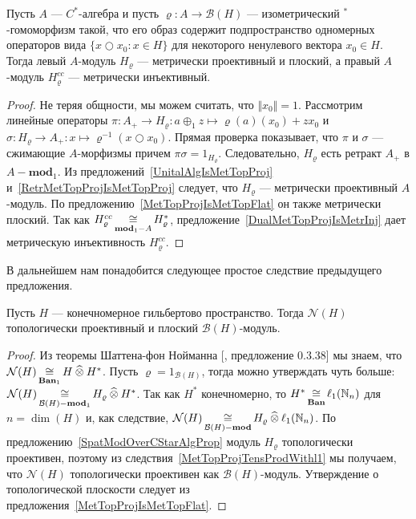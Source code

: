 \begin{proposition}\label{SpatModOverCStarAlgProp} Пусть $A$ --- $C^*$-алгебра и
пусть $\varrho:A\to\mathcal{B}(H)$ --- изометрический ${}^*$-гомоморфизм такой,
что его образ содержит подпространство одномерных операторов вида 
$ \{x\bigcirc x_0:x\in H \}$ для некоторого ненулевого вектора $x_0\in H$. 
Тогда левый $A$-модуль $H_\varrho$ --- метрически проективный и плоский, 
а правый $A$-модуль $H_\varrho^{cc}$ --- метрически инъективный.
\end{proposition}
\begin{proof} Не теряя общности, мы можем считать, что $\Vert x_0\Vert=1$.
Рассмотрим линейные операторы 
$\pi:A_+\to H_\varrho:a\oplus_1 z\mapsto \varrho(a)(x_0)+zx_0$ и 
$\sigma:H_\varrho\to A_+:x\mapsto \varrho^{-1}(x\bigcirc x_0)$. 
Прямая проверка показывает, что $\pi$ и $\sigma$ --- сжимающие
$A$-морфизмы причем $\pi\sigma=1_{H_\varrho}$. Следовательно, $H_\varrho$ есть
ретракт $A_+$ в $A-\mathbf{mod}_1$. Из предложений~\ref{UnitalAlgIsMetTopProj}
и~\ref{RetrMetTopProjIsMetTopProj} следует, что $H_\varrho$ --- метрически
проективный $A$-модуль. По предложению~\ref{MetTopProjIsMetTopFlat} он также
метрически плоский. Так как $H_\varrho^{cc}\mathop{\mathbin{\cong}}\limits_{\mathbf{mod}_1-A}H_\varrho^*$,
предложение~\ref{DualMetTopProjIsMetrInj} дает метрическую инъективность
$H_\varrho^{cc}$.
\end{proof}

В дальнейшем нам понадобится следующее простое следствие предыдущего
предложения.

\begin{proposition}\label{FinDimNHModTopProjFlat} Пусть $H$ --- конечномерное
гильбертово пространство. Тогда $\mathcal{N}(H)$ топологически проективный и
плоский $\mathcal{B}(H)$-модуль.
\end{proposition}
\begin{proof} Из теоремы Шаттена-фон Нойманна [\cite{HelBanLocConvAlg},
предложение 0.3.38] мы знаем, что 
$\mathcal{N}(H)\mathop{\mathbin{\cong}}\limits_{\mathbf{Ban}_1}H\mathbin{\widehat{\otimes}} H^*$. 
Пусть $\varrho=1_{\mathcal{B}(H)}$, тогда можно утверждать чуть больше:
$\mathcal{N}(H)\mathop{\mathbin{\cong}}\limits_{\mathcal{B}(H)-\mathbf{mod}_1} H_\varrho\mathbin{\widehat{\otimes}} H^*$. Так
как $H^*$ конечномерно, то $H^*\mathop{\mathbin{\cong}}\limits_{\mathbf{Ban}}\ell_1(\mathbb{N}_n)$ для
$n=\dim(H)$ и, как следствие, $\mathcal{N}(H)\mathop{\mathbin{\cong}}\limits_{\mathcal{B}(H)-\mathbf{mod}}
H_\varrho\mathbin{\widehat{\otimes}}\ell_1(\mathbb{N}_n)$. По
предложению~\ref{SpatModOverCStarAlgProp} модуль $H_\varrho$ топологически
проективен, поэтому из следствия~\ref{MetTopProjTensProdWithl1} мы получаем, что
$\mathcal{N}(H)$ топологически проективен как $\mathcal{B}(H)$-модуль.
Утверждение о топологической плоскости следует из
предложения~\ref{MetTopProjIsMetTopFlat}.
\end{proof}

